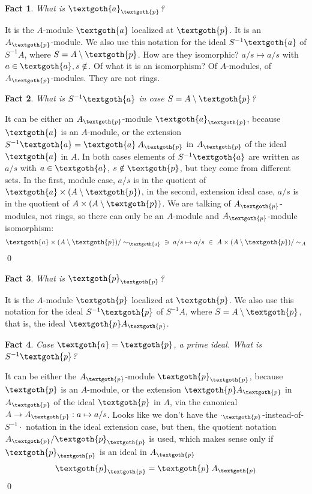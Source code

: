 \documentclass{article}
\newtheorem{theorem}{Fact}[section]
\begin{document}
\bigskip
\begin{theorem}
What is $\textgoth{a}_\textgoth{p}$?
\end{theorem}

\noindent
It is the $A$-module $\textgoth{a}$ localized at $\textgoth{p}$. It is an $A_\textgoth{p}$-module. We also use this notation for the ideal $S^{-1}\textgoth{a}$ of $S^{-1}A$, where $S = A \setminus \textgoth{p}$. How are they isomorphic? $a/s \mapsto a/s$ with $a \in \textgoth{a}, s \notin $.  Of what it is an isomorphism? Of $A$-modules, of $A_\textgoth{p}$-modules. They are not rings.

\bigskip
\begin{theorem}
What is $S^{-1}\textgoth{a}$ in case $S = A \setminus \textgoth{p}$?
\end{theorem}

\noindent
It can be either an $A_\textgoth{p}$-module $\textgoth{a}_\textgoth{p}$, because $\textgoth{a}$ is an $A$-module, or the extension $S^{-1}\textgoth{a} = \textgoth{a} \: A_\textgoth{p}$ in $A_\textgoth{p}$ of the ideal $\textgoth{a}$ in $A$. In both cases elements of $S^{-1}\textgoth{a}$ are written as $a/s$ with $a \in \textgoth{a}$, $s \notin \textgoth{p}$, but they come from different sets. In the first, module case, $a/s$ is in the quotient of $\textgoth{a} \times (A \setminus\textgoth{p})$, in the second, extension ideal case, $a/s$ is in the quotient of $A \times (A \setminus\textgoth{p})$. We are talking of $A_\textgoth{p}$-modules, not rings, so there can only be an $A$-module and $A_\textgoth{p}$-module isomorphism:
\[
  \textgoth{a} \times (A \setminus\textgoth{p}) / \sim_\textgoth{a} \; \; \ni \; a/s \mapsto a/s \; \in \; A \times (A \setminus\textgoth{p}) / \sim_A
\]
\qed

\begin{theorem}
What is $\textgoth{p}_\textgoth{p}$?
\end{theorem}

\noindent
It is the $A$-module $\textgoth{p}$ localized at $\textgoth{p}$. We also use this notation for the ideal $S^{-1}\textgoth{p}$ of $S^{-1}A$, where $S = A \setminus \textgoth{p}$, that is, the ideal $\textgoth{p}A_\textgoth{p}$.

\bigskip
\begin{theorem}
Case $\textgoth{a} = \textgoth{p}$, a prime ideal. What is $S^{-1}\textgoth{p}$?
\end{theorem}

\noindent
It can be either the $A_\textgoth{p}$-module $\textgoth{p}_\textgoth{p}$, because $\textgoth{p}$ is an $A$-module, or the extension $\textgoth{p} A_\textgoth{p}$ in $A_\textgoth{p}$ of the ideal $\textgoth{p}$ in $A$, via the canonical $A \rightarrow A_\textgoth{p} : a \mapsto a/s$. Looks like we don't have the $\cdot_\textgoth{p}$-instead-of-$S^{-1} \cdot$ notation in the ideal extension case, but then, the quotient notation $ A_\textgoth{p} / \textgoth{p}_\textgoth{p}$ is used, which makes sense only if $\textgoth{p}_\textgoth{p}$ is an ideal in $A_\textgoth{p}$
\[
   \textgoth{p}_\textgoth{p} = \textgoth{p} \: A_\textgoth{p}
\]
\qed
\end{document}

